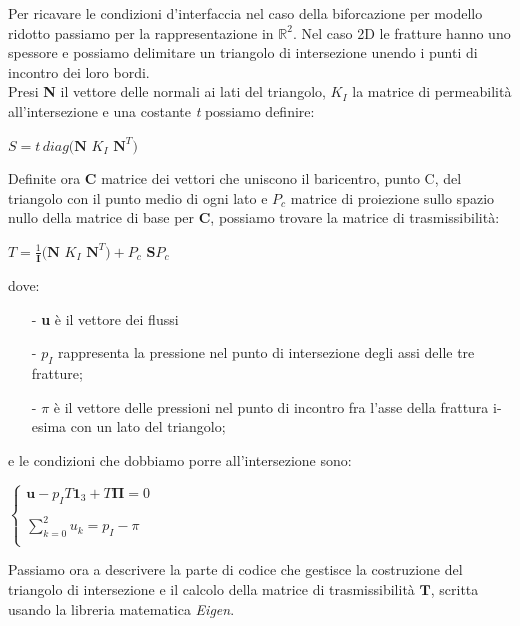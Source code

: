 Per ricavare le condizioni d'interfaccia nel caso della biforcazione per modello ridotto passiamo per la rappresentazione in $\mathbb{R}^{2}$.
Nel caso 2D le fratture hanno uno spessore e possiamo delimitare un triangolo di intersezione unendo i punti di incontro dei loro bordi. \\
Presi \textbf{N} il vettore delle normali ai lati del triangolo, \textbf{$K_{I}$} la matrice di permeabilit\`{a} all'intersezione e una costante \textit{t} possiamo definire:
\begin{center}
	$ S = \textit{t} \, diag( \textbf{N}$ \textbf{$K_{I}$} $ \textbf{N}^{T} ) $
\end{center}
Definite ora \textbf{C} matrice dei vettori che uniscono il baricentro, punto C, del triangolo con il punto medio  di ogni lato e \textbf{$P_{c}$} matrice di proiezione sullo spazio nullo della matrice di base per \textbf{C}, possiamo trovare la matrice di trasmissibilit\`{a}:
\begin{center}
	$ T = \frac{1}{\textbf{I}}( \textbf{N}$ \textbf{$K_{I}$} $ \textbf{N}^{T} ) + $\textbf{$P_{c}$} $\textbf{S}$\textbf{$P_{c}$}
\end{center}
dove:
	\begin{enumerate}
	\item[-] \textbf{u} è il  vettore dei flussi
	\item[-] $p_{I}$ rappresenta la  pressione nel punto di intersezione degli assi delle tre fratture;
	\item[-] \textbf{$\pi$} è il vettore delle pressioni nel punto di incontro fra l'asse della frattura i-esima con un lato del triangolo;
	\end{enumerate} 
e le condizioni che dobbiamo porre all'intersezione sono:
\begin{center}			
	$\left \{
		\begin{array}{l}	
	 		\textbf{u} - p_{I}T\textbf{1}_{3}+T \boldsymbol{\Pi}=0  \\ \\
     	 	\displaystyle \sum_{k=0}^2 u_{k} = p_{I} - \pi  \\
		\end{array}
	\right.$
\end{center} \label{condizioni d'interfaccia}

\par Passiamo ora a descrivere la parte di codice che gestisce la costruzione del triangolo di intersezione e il calcolo della matrice di trasmissibilità $\textbf{T}$, scritta usando la libreria matematica \textit{Eigen}.\\

